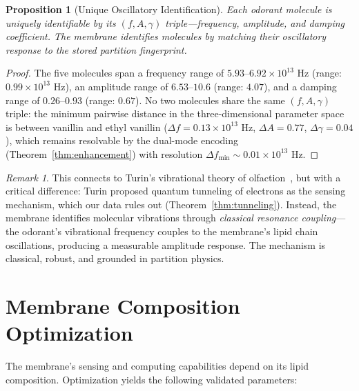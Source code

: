 \documentclass[twocolumn,10pt,a4paper]{article}
\newtheorem{proposition}[theorem]{Proposition}
\theoremstyle{definition}
\theoremstyle{remark}
\newtheorem{remark}[theorem]{Remark}
\begin{document}
\begin{proposition}[Unique Oscillatory Identification]
\label{prop:olfactory}
Each odorant molecule is uniquely identifiable by its $(f, A, \gamma)$ triple---frequency, amplitude, and damping coefficient. The membrane identifies molecules by matching their oscillatory response to the stored partition fingerprint.
\end{proposition}

\begin{proof}
The five molecules span a frequency range of $5.93$--$6.92 \times 10^{13}$ Hz (range: $0.99 \times 10^{13}$ Hz), an amplitude range of $6.53$--$10.6$ (range: $4.07$), and a damping range of $0.26$--$0.93$ (range: $0.67$). No two molecules share the same $(f, A, \gamma)$ triple: the minimum pairwise distance in the three-dimensional parameter space is between vanillin and ethyl vanillin ($\Delta f = 0.13 \times 10^{13}$ Hz, $\Delta A = 0.77$, $\Delta \gamma = 0.04$), which remains resolvable by the dual-mode encoding (Theorem~\ref{thm:enhancement}) with resolution $\Delta f_{\mathrm{min}} \sim 0.01 \times 10^{13}$ Hz. \qedhere
\end{proof}

\begin{remark}
This connects to Turin's vibrational theory of olfaction~\citep{turin1996spectroscopic}, but with a critical difference: Turin proposed quantum tunneling of electrons as the sensing mechanism, which our data rules out (Theorem~\ref{thm:tunneling}). Instead, the membrane identifies molecular vibrations through \emph{classical resonance coupling}---the odorant's vibrational frequency couples to the membrane's lipid chain oscillations, producing a measurable amplitude response. The mechanism is classical, robust, and grounded in partition physics.
\end{remark}


\section{Membrane Composition Optimization}
\label{sec:composition}

The membrane's sensing and computing capabilities depend on its lipid composition. Optimization yields the following validated parameters:
\end{document}
